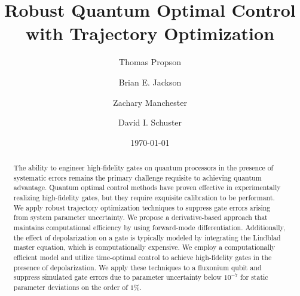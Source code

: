 \title{Robust Quantum Optimal Control with Trajectory Optimization}

\author{Thomas Propson}
\author{Brian E. Jackson}
\author{Zachary Manchester}
\author{David I. Schuster}

\date{\today}

\begin{abstract}
  The ability to engineer high-fidelity gates on quantum processors in the presence of
  systematic errors remains the primary challenge requisite to achieving quantum advantage.
  Quantum optimal control methods have proven effective in experimentally
  realizing high-fidelity gates, but they require exquisite calibration to be performant.
  We apply robust trajectory optimization techniques to suppress gate errors arising from system
  parameter uncertainty.
  We propose a derivative-based approach that maintains
  computational efficiency by using forward-mode differentiation.
  Additionally, the effect of depolarization on a gate is typically modeled by
  integrating the Lindblad master equation,
  which is computationally expensive.
  We employ a computationally efficient model
  and utilize time-optimal control to achieve high-fidelity gates in the presence of depolarization.
  We apply these techniques to a fluxonium qubit and suppress
  simulated gate errors due to parameter uncertainty below $10^{-7}$ for
  static parameter deviations on the order of $1\%$.
\end{abstract}

\maketitle
